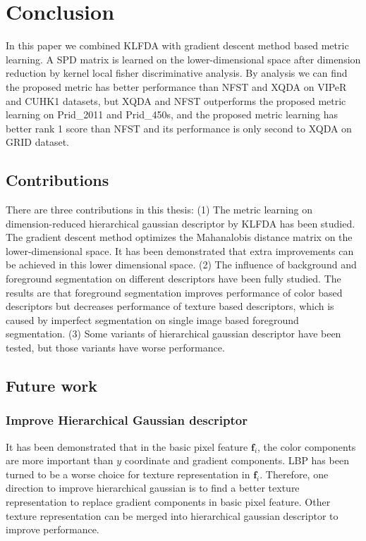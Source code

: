 
\chapter{Conclusion} %

In this paper we combined KLFDA with gradient descent method based metric learning. A SPD matrix is learned on the lower-dimensional space after dimension reduction by kernel local fisher discriminative analysis. By analysis we can find the proposed metric has better performance than NFST and XQDA on VIPeR and CUHK1 datasets, but XQDA and NFST outperforms the proposed metric learning on Prid\_2011 and Prid\_450s, and the proposed metric learning has better rank 1 score than NFST and its performance is only second to XQDA on GRID dataset. 
\section{Contributions}
There are three contributions in this thesis: (1) The metric learning on dimension-reduced hierarchical gaussian descriptor by KLFDA has been studied. The gradient descent method optimizes the Mahanalobis distance matrix on the lower-dimensional space. It has been demonstrated that extra improvements can be achieved in this lower dimensional space. (2) The influence of background and foreground segmentation on different descriptors have been fully studied. The results are that foreground segmentation improves performance of color based descriptors but decreases performance of texture based descriptors, which is caused by imperfect segmentation on single image based foreground segmentation. (3) Some variants of hierarchical gaussian descriptor have been tested, but those variants have worse performance.
\section{Future work}
\subsection{Improve Hierarchical Gaussian descriptor}
It has been demonstrated that in the basic pixel feature $\bm{f}_i$, the color components are more important than $y$ coordinate and gradient components. LBP has been turned to be a worse choice for texture representation in $\bm{f}_i$. Therefore, one direction to improve hierarchical gaussian is to find a better texture representation to replace gradient components in basic pixel feature. Other texture representation can be merged into hierarchical gaussian descriptor to improve performance.
